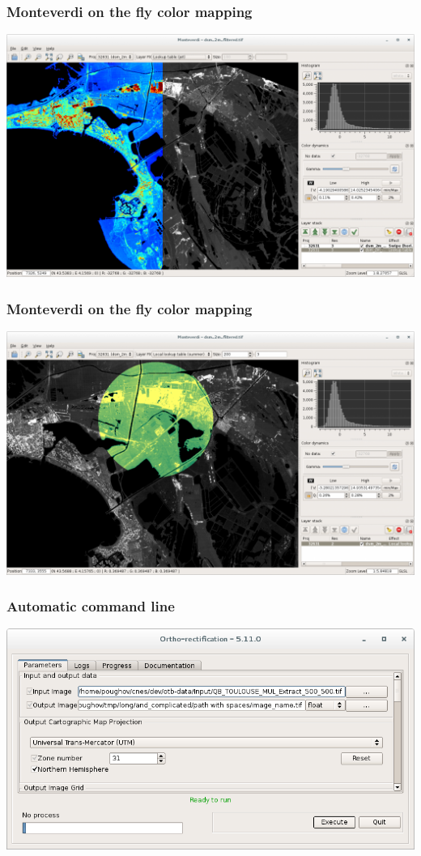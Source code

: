 \documentclass[8pt]{beamer}
\begin{document}
\begin{frame}
\frametitle{Monteverdi on the fly color mapping}
\includegraphics[width=1\textwidth]{images/monteverdi-colormapping.png}
\end{frame}

\begin{frame}
\frametitle{Monteverdi on the fly color mapping}
\includegraphics[width=1\textwidth]{images/monteverdi-colormapping2.png}
\end{frame}

\begin{frame}
\frametitle{Automatic command line}
\includegraphics[width=1\textwidth]{images/gui-bashline.png}
\end{frame}
\end{document}
